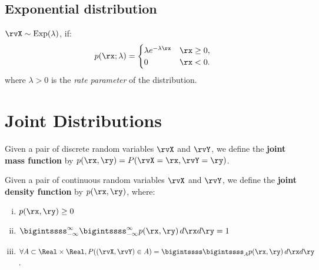 \subsection{Exponential distribution}
\(\rvX \sim \text{Exp}(\lambda)\), if:
\begin{align*}
	p(\rx;\lambda) =
	\begin{cases}
		\lambda e^{-\lambda \rx} & \rx \ge 0, \\
		0 & \rx < 0.
	\end{cases}
\end{align*}
where \(\lambda > 0\) is the \emph{rate parameter} of the distribution.

\section{Joint Distributions}
\begin{definition}
	Given a pair of discrete random variables \(\rvX\) and \(\rvY\), we define the \textbf{joint mass function} by \(p(\rx, \ry)=P(\rvX=\rx,\rvY=\ry)\).
\end{definition}
\begin{definition}
	Given a pair of continuous random variables \(\rvX\) and \(\rvY\), we define the \textbf{joint density function} by \(p(\rx, \ry)\), where:
	\begin{enumerate}
		[i.]
		\item \(p(\rx, \ry) \geq 0\)
		\item \(\bigintssss_{-\infty}^{\infty}\bigintssss_{-\infty}^{\infty}p(\rx,\ry) \, d\rx d\ry =1\)
		\item \(\forall A \subset \Real \times \Real, P((\rvX,\rvY)\in A)=\bigintssss\bigintssss_{A}p(\rx,\ry)\, d\rx d\ry \).
	\end{enumerate}
\end{definition}


